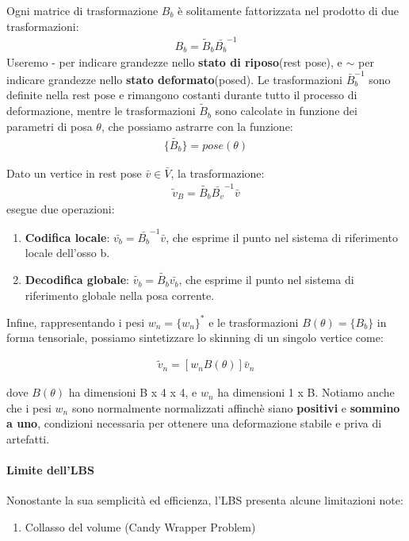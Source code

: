 \begin{itemize}
Ogni matrice di trasformazione \(B_b\) è solitamente fattorizzata nel prodotto di due trasformazioni:
\begin{align*}
    B_b = \tilde{B}_b\bar{{B}_b}^{-1}
\end{align*}
Useremo - per indicare grandezze nello \textbf{stato di riposo}(rest pose), e $\sim$ per indicare grandezze nello \textbf{stato deformato}(posed).
Le trasformazioni $\bar{B}_b^{-1}$ sono definite nella rest pose e rimangono costanti durante tutto il processo di deformazione, mentre le trasformazioni $\tilde{B}_b$ sono calcolate in funzione dei parametri di posa $\theta$, che possiamo astrarre con la funzione: 
\begin{align*}
    \{\tilde{B_b}\} = pose(\theta)
\end{align*}

Dato un vertice in rest pose $\bar{v} \in \bar{V}$, la trasformazione:
\begin{align*}
    \tilde{v}_B = \tilde{B_b}\bar{B_v}^{-1}\bar{v}
\end{align*}
esegue due operazioni:
\begin{enumerate}
    \item \textbf{Codifica locale}: $\bar{v_b}=\bar{B_b}^{-1}\bar{v}$, che esprime il punto nel sistema di riferimento locale dell'osso b.
    \item \textbf{Decodifica globale}: $\tilde{v_b}=\tilde{B_b}\bar{v_b}$, che esprime il punto nel sistema di riferimento globale nella posa corrente.
\end{enumerate}

Infine, rappresentando i pesi $w_n = \{w_n\}^*$ e le trasformazioni \(B(\theta) = \{B_b\}\) in forma tensoriale, possiamo sintetizzare lo skinning di un singolo vertice come:

\begin{align*}
    \tilde{v}_n = [w_nB(\theta)]\bar{v}_n
\end{align*}

dove \(B(\theta)\) ha dimensioni B x 4 x 4, e \(w_n\) ha dimensioni 1 x B.
Notiamo anche che i pesi \(w_n\) sono normalmente normalizzati affinchè siano \textbf{positivi} e \textbf{sommino a uno}, condizioni necessaria per ottenere una deformazione stabile e priva di artefatti.~\cite{lbs}

\paragraph{Limite dell'LBS}
Nonostante la sua semplicità ed efficienza, l'LBS presenta alcune limitazioni note:
\begin{enumerate}
    \item Collasso del volume (Candy Wrapper Problem)
    

\end{enumerate}
\end{itemize}
